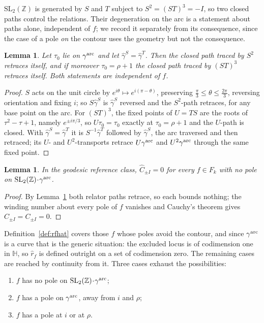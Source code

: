 \documentclass[11pt]{article}
\newtheorem{lemma}[theorem]{Lemma}
\newcommand{\HH}{\mathbb{H}}
\newcommand{\ZZ}{\mathbb{Z}}
\newcommand{\SLZ}{\mathrm{SL}_2(\ZZ)}
\begin{document}
$\SLZ$ is generated by $S$ and $T$ subject to $S^2=(ST)^3=-I$, so two closed paths control the
relations. Their degeneration on the arc is a statement about paths alone, independent of $f$; we
record it separately from its consequence, since the case of a pole \emph{on} the contour uses the
geometry but not the consequence.

\begin{lemma}\label{lem:georetrace}
Let $\tau_0$ lie on $\gamma^{\rm arc}$ and let $\hat\gamma^S=\hat\gamma^T$. Then the closed path
traced by $S^2$ retraces itself, and if moreover $\tau_0=\rho+1$ the closed path traced by
$(ST)^3$ retraces itself. Both statements are independent of $f$.
\end{lemma}

\begin{proof}
$S$ acts on the unit circle by $e^{i\theta}\mapsto e^{i(\pi-\theta)}$, preserving
$\tfrac{\pi}{3}\le\theta\le\tfrac{2\pi}{3}$, reversing orientation and fixing $i$; so
$S\hat\gamma^S$ is $\hat\gamma^S$ reversed and the $S^2$-path retraces, for any base point on the
arc. For $(ST)^3$, the fixed points of $U=TS$ are the roots of $\tau^2-\tau+1$, namely
$e^{\pm i\pi/3}$, so $U\tau_0=\tau_0$ exactly at $\tau_0=\rho+1$ and the $U$-path is closed. With
$\hat\gamma^S=\hat\gamma^T$ it is $S^{-1}\hat\gamma^T$ followed by $\hat\gamma^S$, the arc
traversed and then retraced; its $U$- and $U^2$-transports retrace $U\gamma^{\rm arc}$ and
$U^2\gamma^{\rm arc}$ through the same fixed point.
\end{proof}

\begin{lemma}\label{lem:geoloops}
In the geodesic reference class, $\hat C_{\pm I}=0$ for every $f\in F_k$ with no pole on
$\SLZ\!\cdot\!\gamma^{\rm arc}$.
\end{lemma}

\begin{proof}
By Lemma~\ref{lem:georetrace} both relator paths retrace, so each bounds nothing; the winding
number about every pole of $f$ vanishes and Cauchy's theorem gives $\hat C_{\pm I}=C_{\pm I}=0$.
\end{proof}

Definition~\ref{def:rfhat} covers those $f$ whose poles avoid the contour, and since
$\gamma^{\rm arc}$ is a curve that is the generic situation: the excluded locus is of codimension
one in $\HH$, so $\hat r_f$ is defined outright on a set of codimension zero. The remaining cases
are reached by continuity from it. Three cases exhaust the possibilities:
\begin{enumerate}
\item $f$ has no pole on $\SLZ\!\cdot\!\gamma^{\rm arc}$;
\item $f$ has a pole on $\gamma^{\rm arc}$, away from $i$ and $\rho$;
\item $f$ has a pole at $i$ or at $\rho$.
\end{enumerate}
\end{document}
